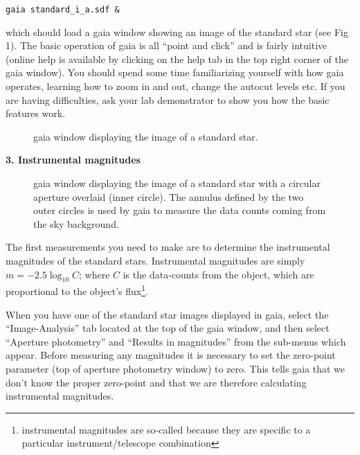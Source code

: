 {\tt \verb,gaia standard_i_a.sdf &,}

which should load a {\sc gaia} window showing an image of the standard star (see Fig 1). The basic operation of {\sc gaia} is all ``point and click'' and is fairly intuitive (online help is available by clicking on the {\sc help} tab in the top right corner of the {\sc gaia} window). You should spend some time familiarizing yourself with how {\sc gaia} operates, learning how to zoom in and out, change the autocut levels etc. If you are having difficulties, ask your lab demonstrator to show you how the basic features work.

\newpage

\begin{figure}
\centerline{}
\caption{{\sc gaia} window displaying the image of a standard star.}
\end{figure}

{\large{\bf 3. Instrumental magnitudes}}

\begin{figure}
\centerline{}
\caption{{\sc gaia} window displaying the image of a standard star with a circular aperture overlaid (inner circle). The annulus defined by the two outer circles is used by {\sc gaia} to measure the data counts coming from the sky background.}
\end{figure}
The first measurements you need to make are to determine the instrumental magnitudes of the standard stars. Instrumental magnitudes are simply $m = -2.5\log_{10} C$; where $C$ is the data-counts from the object, which are proportional to the object's flux\footnote{instrumental magnitudes are so-called because they are specific to a particular instrument/telescope combination}. 

When you have one of the standard star images displayed in {\sc gaia}, select the ``Image-Analysis'' tab located at the top of the {\sc gaia} window, and then select ``Aperture photometry'' and ``Results in magnitudes'' from the sub-menus which appear. Before measuring any magnitudes it is necessary to set the zero-point parameter (top of aperture photometry window) to zero. This tells {\sc gaia} that we don't know the proper zero-point and that we are therefore calculating instrumental magnitudes. 

